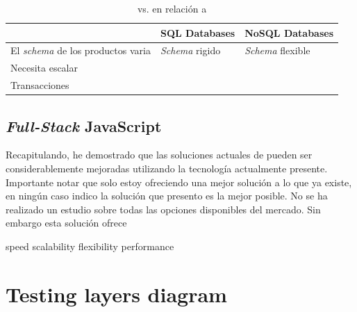 \begin{table}[h!]
    \tiny
   
\begin{tabular}{ |L{0.1\paperwidth}|L{0.3\paperwidth}|L{0.3\paperwidth}|}
\hline
	\ecommerce&
	SQL Databases &
	NoSQL Databases
 
\\ \hline
	El \textit{schema} de los productos varia&
	\textit{Schema} rigido&
	\textit{Schema} flexible
\\ \hline
	Necesita escalar&
	&
	
\\ \hline
	Transacciones&
	&
	
\\ \hline
\end{tabular}
    \caption{ \nosql vs. \sql en relación a \ecommerce}
    \label{tab:SQL_vs_noSQL_summary}
\end{table}

	\subsection{ \textit{Full-Stack} JavaScript }
	



Recapitulando, he demostrado que las soluciones actuales de \ecommerce pueden ser considerablemente mejoradas utilizando la tecnología actualmente presente. 
Importante notar que solo estoy ofreciendo una mejor solución a lo que ya existe, en ningún caso indico la solución que presento es la mejor posible. No se ha realizado un estudio sobre todas las opciones disponibles del mercado. Sin embargo esta solución ofrece

speed
scalability
flexibility
performance

\section{Testing layers diagram }\label{cap:estadoArte:testing_something}


